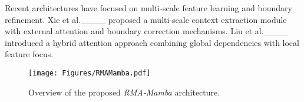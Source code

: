 Recent architectures have focused on multi-scale feature learning and boundary refinement. Xie et al.____ proposed a multi-scale context extraction module with external attention and boundary correction mechanisms. Liu et al.____ introduced a hybrid attention approach combining global dependencies with local feature focus. %

\begin{figure*} [!t]
    \centering
    \texttt{[image: Figures/RMAMamba.pdf]}
    \caption{Overview of the proposed \textit{RMA-Mamba} architecture.}
    \label{fig:RMAMamba}
\end{figure*}